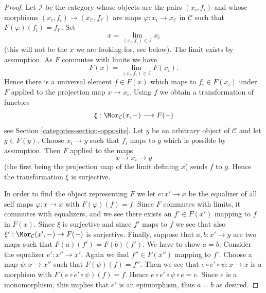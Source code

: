\begin{proof}
Let $\mathcal{I}$ be the category whose objects are the pairs $(x_i, f_i)$
and whose morphisms $(x_i, f_i) \to (x_{i'}, f_{i'})$ are maps
$\varphi : x_i \to x_{i'}$ in $\mathcal{C}$
such that $F(\varphi)(f_i) = f_{i'}$. Set
$$
x = \lim_{(x_i, f_i) \in \mathcal{I}} x_i
$$
(this will not be the $x$ we are looking for, see below).
The limit exists by assumption. As $F$ commutes with limits
we have
$$
F(x) = \lim_{(x_i, f_i) \in \mathcal{I}} F(x_i).
$$
Hence there is a universal element $f \in F(x)$ which maps to $f_i \in F(x_i)$
under $F$ applied to the projection map $x \to x_i$.
Using $f$ we obtain a transformation of functors
$$
\xi : \Mor_\mathcal{C}(x, - ) \longrightarrow F(-)
$$
see Section \ref{categories-section-opposite}. Let $y$ be an arbitrary object of
$\mathcal{C}$ and let $g \in F(y)$. Choose $x_i \to y$ such that $f_i$
maps to $g$ which is possible by assumption. Then $F$ applied to the maps
$$
x \longrightarrow x_i \longrightarrow y
$$
(the first being the projection map of the limit defining $x$)
sends $f$ to $g$. Hence the transformation $\xi$ is surjective.

\medskip\noindent
In order to find the object representing $F$ we let $e : x' \to x$ be the
equalizer of all self maps $\varphi : x \to x$ with $F(\varphi)(f) = f$.
Since $F$ commutes with limits, it commutes with equalizers, and
we see there exists an $f' \in F(x')$ mapping to $f$ in $F(x)$.
Since $\xi$ is surjective and since $f'$ maps to $f$ we see that
also $\xi' : \Mor_\mathcal{C}(x', -) \to F(-)$ is surjective.
Finally, suppose that $a, b : x' \to y$ are two maps such that
$F(a)(f') = F(b)(f')$. We have to show $a = b$. Consider the equalizer
$e' : x'' \to x'$. Again we find $f'' \in F(x'')$ mapping to $f'$.
Choose a map $\psi : x \to x''$ such that $F(\psi)(f) = f''$.
Then we see that $e \circ e' \circ \psi : x \to x$ is a morphism
with $F(e \circ e' \circ \psi)(f) = f$. Hence
$e \circ e' \circ \psi \circ e = e$. Since $e$ is a monomorphism,
this implies that $e'$ is an epimorphism, thus $a = b$ as desired.
\end{proof}

